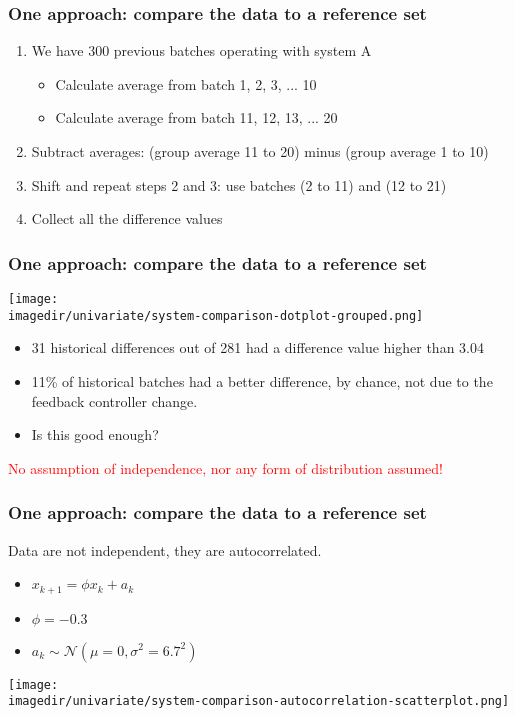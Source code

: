 \begin{frame}\frametitle{One approach: compare the data to a reference set}
	\begin{enumerate}
		\item	We have 300 previous batches operating with system A
		\begin{itemize}
			\item	Calculate average from batch 1, 2, 3, ... 10
			\item	Calculate average from batch 11, 12, 13, ... 20
		\end{itemize}
		\item	Subtract averages: (group average 11 to 20) minus (group average 1 to 10)
		\item	Shift and repeat steps 2 and 3: use batches (2 to 11) and (12 to 21)
		\item	Collect all the difference values
	\end{enumerate}
\end{frame}

\begin{frame}\frametitle{One approach: compare the data to a reference set}

	\texttt{[image: \\imagedir/univariate/system-comparison-dotplot-grouped.png]}
	\begin{itemize}
		\item	31 historical differences out of 281 had a difference value higher than 3.04
		\item	11\% of historical batches had a better difference, by chance, not due to the feedback controller change.
		\item	Is this good enough?
	\end{itemize}

	\textcolor{red}{No assumption of independence, nor any form of distribution assumed!}
\end{frame}

\begin{frame}\frametitle{One approach: compare the data to a reference set}

	Data are not independent, they are autocorrelated.
	\begin{itemize}
		\item	$x_{k+1} = \phi x_{k} + a_k$
		\item	$\phi = -0.3$
		\item	$a_k \sim \mathcal{N}\left(\mu=0, \sigma^2=6.7^2\right)$
	\end{itemize}
	\begin{center}
		\texttt{[image: \\imagedir/univariate/system-comparison-autocorrelation-scatterplot.png]}
	\end{center}
\end{frame}

